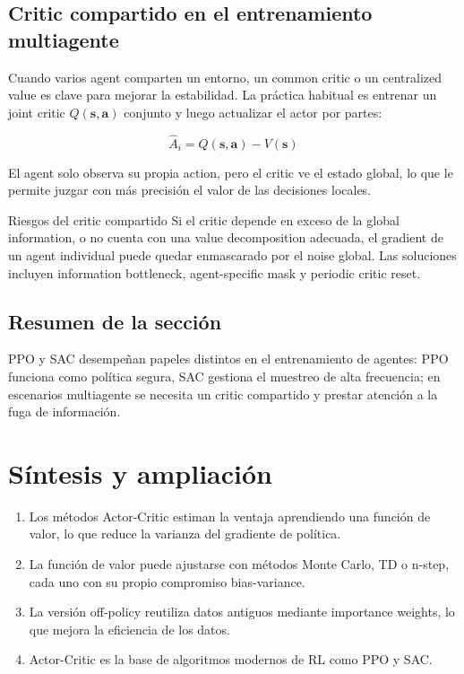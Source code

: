 \documentclass[a4paper]{article}
\begin{document}
\subsection{Critic compartido en el entrenamiento multiagente}

Cuando varios agent comparten un entorno, un common critic o un centralized value es clave para mejorar la estabilidad. La práctica habitual es entrenar un joint critic $Q(\boldsymbol{s}, \boldsymbol{a})$ conjunto y luego actualizar el actor por partes:

$$\hat{A}_i = Q(\boldsymbol{s}, \boldsymbol{a}) - V(\boldsymbol{s})$$

El agent solo observa su propia action, pero el critic ve el estado global, lo que le permite juzgar con más precisión el valor de las decisiones locales.

\begin{warningbox}{Riesgos del critic compartido}
Si el critic depende en exceso de la global information, o no cuenta con una value decomposition adecuada, el gradient de un agent individual puede quedar enmascarado por el noise global. Las soluciones incluyen information bottleneck, agent-specific mask y periodic critic reset.
\end{warningbox}

\subsection{Resumen de la sección}

PPO y SAC desempeñan papeles distintos en el entrenamiento de agentes: PPO funciona como política segura, SAC gestiona el muestreo de alta frecuencia; en escenarios multiagente se necesita un critic compartido y prestar atención a la fuga de información.

\section{Síntesis y ampliación}

\begin{enumerate}
    \item Los métodos Actor-Critic estiman la ventaja aprendiendo una función de valor, lo que reduce la varianza del gradiente de política.
    \item La función de valor puede ajustarse con métodos Monte Carlo, TD o n-step, cada uno con su propio compromiso bias-variance.
    \item La versión off-policy reutiliza datos antiguos mediante importance weights, lo que mejora la eficiencia de los datos.
    \item Actor-Critic es la base de algoritmos modernos de RL como PPO y SAC.
\end{enumerate}
\end{document}
